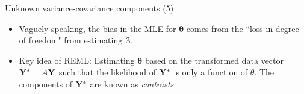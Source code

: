 \documentclass{beamer}
\newcommand{\boldbeta}{{\boldsymbol \beta}}
\newcommand{\boldtheta}{{\boldsymbol \theta}}
\newenvironment{wideitemize}%
  {\begin{itemize}%
    \setlength{\parskip}{1em}}%
  {\end{itemize}}
\begin{document}
\begin{frame}{Unknown variance-covariance components (5)}

\begin{wideitemize}

 
 \item Vaguely speaking, the bias in the MLE for $\boldtheta$ comes from the ``loss in degree of freedom" from estimating $\boldbeta$. 
 
 
 
 \item Key idea of REML:   Estimating $\boldtheta$ based  on the transformed data vector ${\bf Y}^* = A {\bf Y}$ such that the likelihood of ${\bf Y}^*$ is only a function of $\theta$.  The components of ${\bf Y}^*$ are known as \emph{contrasts}. 

 

\end{wideitemize}
\end{frame}
\end{document}
